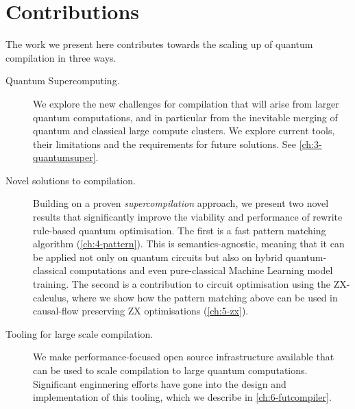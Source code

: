 \section{Contributions}
The work we present here contributes towards the scaling up of quantum compilation
in three ways.
\begin{description}
  \item[Quantum Supercomputing.]
    We explore the new challenges for compilation that will arise from larger quantum
    computations, and in particular from the inevitable merging of quantum and classical
    large compute clusters. We explore current tools, their limitations and the
    requirements for future solutions. See \cref{ch:3-quantumsuper}.
  \item[Novel solutions to compilation.]
    Building on a proven \emph{supercompilation} approach, we 
    present two novel results that significantly improve the viability and performance 
    of rewrite rule-based quantum optimisation.
    The first is a fast pattern matching algorithm (\cref{ch:4-pattern}).
    This is semantics-agnostic, meaning that it can be applied not only on quantum circuits
    but also on hybrid quantum-classical computations and even pure-classical Machine Learning
    model training.
    The second is a contribution to circuit optimisation using the ZX-calculus, where we show
    how the pattern matching above can be used in causal-flow preserving ZX optimisations (\cref{ch:5-zx}). 
  \item[Tooling for large scale compilation.]
    We make performance-focused open source infrastructure available that can be
    used to scale compilation to large quantum computations.
    Significant enginnering efforts have gone into the design and implementation of
    this tooling, which we describe in \cref{ch:6-futcompiler}.
\end{description}
